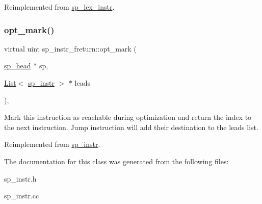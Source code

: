 Reimplemented from \mbox{\hyperlink{classsp__lex__instr_adcace7d5b7daeb393d0592592a2d9d6c}{sp\+\_\+lex\+\_\+instr}}.

\mbox{\label{classsp__instr__freturn_a9556622fcb532514742de4c9fdf4d506}} 
\subsubsection{\texorpdfstring{opt\+\_\+mark()}{opt\_mark()}}
{\footnotesize\ttfamily virtual uint sp\+\_\+instr\+\_\+freturn\+::opt\+\_\+mark (\begin{DoxyParamCaption}\item[{\mbox{\hyperlink{classsp__head}{sp\+\_\+head}} $\ast$}]{sp,  }\item[{\mbox{\hyperlink{classList}{List}}$<$ \mbox{\hyperlink{classsp__instr}{sp\+\_\+instr}} $>$ $\ast$}]{leads }\end{DoxyParamCaption})\hspace{0.3cm}{\ttfamily [inline]}, {\ttfamily [virtual]}}

Mark this instruction as reachable during optimization and return the index to the next instruction. Jump instruction will add their destination to the leads list. 

Reimplemented from \mbox{\hyperlink{classsp__instr_a10b7b33a30316fca4cff5adfe98e282c}{sp\+\_\+instr}}.



The documentation for this class was generated from the following files\+:\begin{DoxyCompactItemize}
\item 
sp\+\_\+instr.\+h\item 
sp\+\_\+instr.\+cc\end{DoxyCompactItemize}
